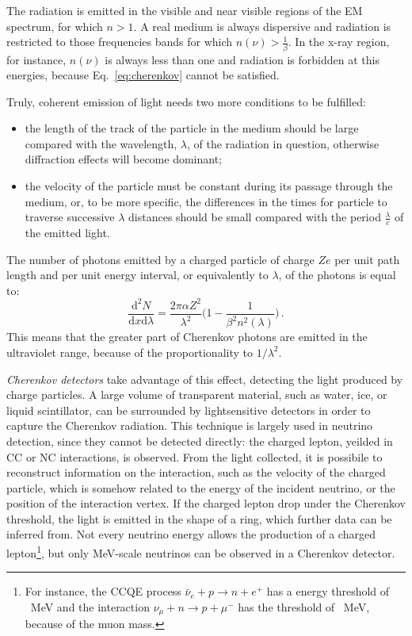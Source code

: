  The radiation is emitted in the visible and near visible regions of the EM spectrum, for which $ n > 1$.
 A real medium is always dispersive and radiation is restricted to those frequencies bands for which %
 $n(\nu) > \frac{1}{\beta}$.
 In the x-ray region, for instance, $n(\nu)$ is always less than one and radiation is forbidden at this energies, %
 because Eq.~\ref{eq:cherenkov} cannot be satisfied.

 Truly, coherent emission of light needs two more conditions to be fulfilled:
 \begin{itemize}
   \item the length of the track of the particle in the medium should be large compared with the wavelength, %
     $\lambda$, of the radiation in question, otherwise diffraction effects will become dominant;
   \item the velocity of the particle must be constant during its passage through the medium, or, %
     to be more specific, the differences in the times for particle to traverse successive $\lambda$ distances %
     should be small compared with the period $\frac{\lambda}{c}$ of the emitted light.
 \end{itemize}

 The number of photons emitted by a charged particle of charge $Ze$ per unit path length and per unit %
 energy interval, or equivalently to $\lambda$, of the photons is equal to:
 \begin{equation}
   \label{eq:ch_ph}
   \frac{\mathrm{d}^2N}{\mathrm{d}x\mathrm{d}\lambda} = \frac{2\pi\alpha Z^2}{\lambda^2} %
   \bigg(1-\frac{1}{\beta^2 n^2(\lambda)} \bigg)\,.
 \end{equation}
 This means that the greater part of Cherenkov photons are emitted in the ultraviolet range, because of the %
 proportionality to $1/\lambda^2$.

 \emph{Cherenkov detectors} take advantage of this effect, detecting the light produced by charge particles.
 A large volume of transparent material, such as water, ice, or liquid scintillator, can be %
 surrounded by lightsensitive detectors in order to capture the Cherenkov radiation.
 This technique is largely used in neutrino detection, since they cannot be detected directly: the charged lepton, %
 yeilded in CC or NC interactions, is observed.
 From the light collected, it is possibile to reconstruct information on the interaction, such as the velocity %
 of the charged particle, which is somehow related to the energy of the incident neutrino, or the position %
 of the interaction vertex.
 If the charged lepton drop under the Cherenkov threshold, the light is emitted in the shape of a ring, which %
 further data can be inferred from.
 Not every neutrino energy allows the production of a charged lepton\footnote{For instance, the CCQE process %
   $\bar\nu_e+p\rightarrow n+e^+$ has a energy threshold of ~MeV and the interaction %
   $\nu_\mu+n\rightarrow p+\mu^-$ has the threshold of ~MeV, because of the muon mass.}, %
 but only MeV-scale neutrinos can be observed in a Cherenkov detector.


